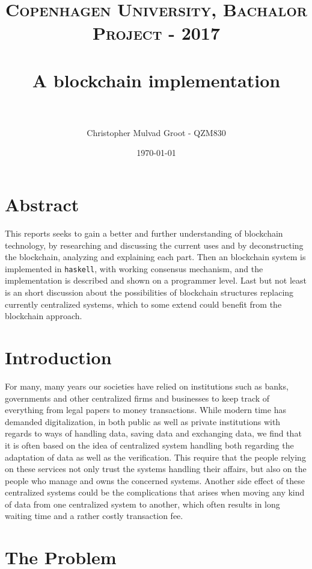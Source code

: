 \documentclass[paper=a4, fontsize=11pt]{scrartcl} %
\title{	
\normalfont \normalsize 
\textsc{Copenhagen University, Bachalor Project - 2017} \\ [25pt] %
\horrule{0.5pt} \\[0.4cm] %
\huge A blockchain implementation \\ %
\horrule{2pt} \\[0.5cm] %
}
\author{Christopher Mulvad Groot - QZM830} %
\date{\normalsize\today} %
\numberwithin{equation}{section} %
\numberwithin{figure}{section} %
\numberwithin{table}{section} %
\begin{document}
\maketitle %
\thispagestyle{empty}
\newpage
\tableofcontents
\thispagestyle{empty}
\newpage

\clearpage
\setcounter{page}{1}

\section{Abstract}

This reports seeks to gain a better and further understanding of blockchain technology, by researching and discussing the current uses and by deconstructing the blockchain, analyzing and explaining each part. Then an blockchain system is implemented in \texttt{haskell}, with working consensus mechanism, and the implementation is described and shown on a programmer level. Last but not least is an short discussion about the possibilities of blockchain structures replacing currently centralized systems, which to some extend could benefit from the blockchain approach. 

\section{Introduction}

For many, many years our societies have relied on institutions such as banks, governments and other centralized firms and businesses to keep track of everything from legal papers to money transactions. While modern time has demanded digitalization, in both public as well as private institutions with regards to ways of handling data, saving data and exchanging data, we find that it is often based on the idea of centralized system handling both regarding the adaptation of data as well as the verification. This require that the people relying on these services not only trust the systems handling their affairs, but also on the people who manage and owns the concerned systems. Another side effect of these centralized systems could be the complications that arises when moving any kind of data from one centralized system to another, which often results in long waiting time and a rather costly transaction fee.

\section{The Problem}
\end{document}
